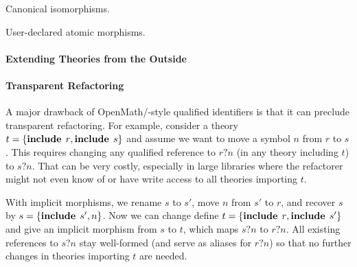 Canonical isomorphisms.

User-declared atomic morphisms.

\paragraph{Extending Theories from the Outside}

\paragraph{Transparent Refactoring}
A major drawback of OpenMath/\mmt-style qualified identifiers is that it can preclude transparent refactoring.
For example, consider a theory $t=\{\operatorname{\mathbf{include}}{\;r},\operatorname{\mathbf{include}}{\;s}\}$ and assume we want to move a symbol $n$ from $r$ to $s$.
This requires changing any qualified reference to $r?n$ (in any theory including $t$) to $s?n$.
That can be very costly, especially in large libraries where the refactorer might not even know of or have write access to all theories importing $t$.

With implicit morphisms, we rename $s$ to $s'$, move $n$ from $s'$ to $r$, and recover $s$ by $s=\{\operatorname{\mathbf{include}}{\;s'},n\}$.
Now we can change define $t=\{\operatorname{\mathbf{include}}{\;r},\operatorname{\mathbf{include}}{\;s'}\}$ and give an implicit morphism from $s$ to $t$, which maps $s?n$ to $r?n$.
All existing references to $s?n$ stay well-formed (and serve as aliases for $r?n$) so that no further changes in theories importing $t$ are needed.
